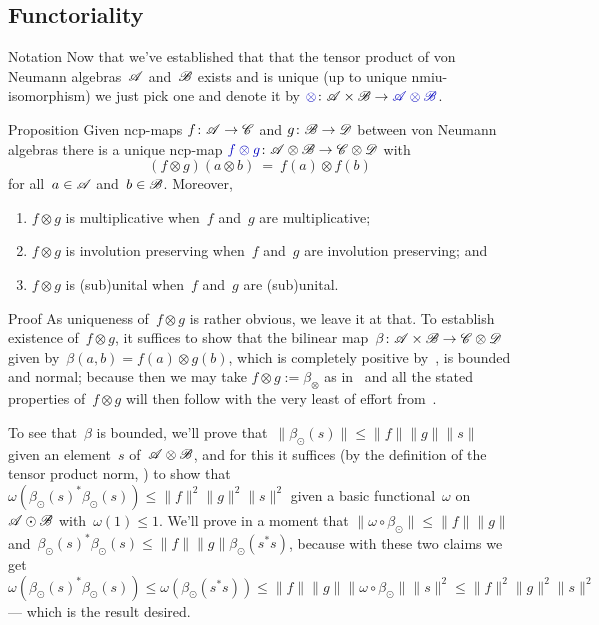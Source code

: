\documentclass[a]{subfiles}
\begin{document}
\subsection{Functoriality}
\begin{parsec}%
\begin{point}{Notation}%
Now that we've established
that that the tensor product
of von Neumann algebras~$\mathscr{A}$ and~$\mathscr{B}$
exists and is unique (up to unique nmiu-isomorphism)
we just pick one and denote it by $\Define{\otimes}\colon
\scrA\times\scrB\to\Define{\scrA\otimes\scrB}$.
\end{point}
\begin{point}{Proposition}%
Given ncp-maps $f\colon \mathscr{A}\to\mathscr{C}$
and $g\colon \mathscr{B}\to\mathscr{D}$
between von Neumann algebras
there is a unique ncp-map
$\Define{f\otimes g}\colon \scrA\otimes\scrB\to\scrC\otimes\scrD$
with 
\begin{equation*}
	(f\otimes g)(a\otimes b) \ =\ f(a)\otimes f(b)
\end{equation*}
for all~$a\in\mathscr{A}$ and~$b\in\mathscr{B}$.
Moreover,
\begin{enumerate}
\item
$f\otimes g$ is multiplicative 
when~$f$ and~$g$ are multiplicative;
\item
$f\otimes g$ is involution preserving
when~$f$ and~$g$ are involution preserving; and
\item
$f\otimes g$ is (sub)unital 
when~$f$ and~$g$ are (sub)unital.
\end{enumerate}
\begin{point}{Proof}%
As uniqueness of~$f\otimes g$ is rather obvious,
we leave it at that.
To establish
existence of~$f\otimes g$,
it suffices to show
that the bilinear map~$\beta\colon \mathscr{A}\times\mathscr{B}\to\mathscr{C}\otimes\mathscr{D}$
given by~$\beta(a,b)=f(a)\otimes g(b)$,
which is completely positive by~,
is bounded and normal;
because then we may take $f\otimes g:=\beta_\otimes$
as in~
and all
the stated properties of~$f\otimes g$ will then  follow 
with the very least of effort
from~.

To see that~$\beta$ is bounded,
we'll prove that~$\|\beta_\odot(s)\| \leq \|f\|\|g\| \|s\|$
given an element~$s$ of~$\mathscr{A}\otimes \mathscr{B}$,
and for this
it suffices (by the definition
of the tensor product norm, ) 
to show that
$\omega(\beta_\odot(s)^*\beta_\odot(s))
\leq \|f\|^2\|g\|^2\|s\|^2$
given a basic functional~$\omega$
on~$\mathscr{A}\odot\mathscr{B}$ with~$\omega(1)\leq 1$.
We'll prove in a moment that
$\|\omega\circ\beta_\odot\|\leq \|f\|\|g\|$
and~$\beta_\odot(s)^*\beta_\odot(s)\leq
\|f\|\|g\|\beta_\odot(s^*s)$,
because with these two claims
we get 
$\omega(\beta_\odot(s)^*\beta_\odot(s))
\leq \omega(\beta_\odot(s^*s))
\leq \|f\|\|g\| \|\omega\circ \beta_\odot\| \|s\|^2
\leq \|f\|^2\|g\|^2\|s\|^2$
 --- which is the result desired.


\end{point}
\end{point}
\end{parsec}
\end{document}
